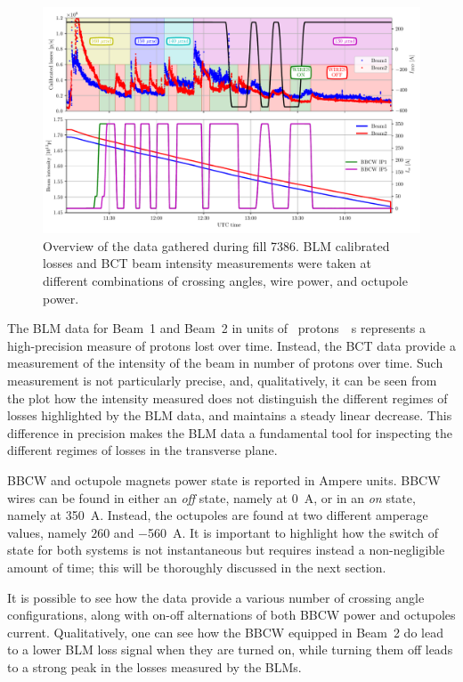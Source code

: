 \begin{figure}[hpt]
    \centering
    \includegraphics[width=1.0\textwidth]{5_wire_compensators_LHC/figs/wire_summary.pdf}
    \caption{Overview of the data gathered during fill 7386. BLM calibrated losses and BCT beam intensity measurements were taken at different combinations of crossing angles, wire power, and octupole power.}
    \label{fig:wire-data}
\end{figure}

The BLM data for Beam~1 and Beam~2 in units of \SI{}{protons \per s} represents a high-precision measure of protons lost over time. Instead, the BCT data provide a measurement of the intensity of the beam in number of protons over time. Such measurement is not particularly precise, and, qualitatively, it can be seen from the plot how the intensity measured does not distinguish the different regimes of losses highlighted by the BLM data, and maintains a steady linear decrease. This difference in precision makes the BLM data a fundamental tool for inspecting the different regimes of losses in the transverse plane.  

BBCW and octupole magnets power state is reported in Ampere units.  BBCW wires can be found in either an \textit{off} state, namely at \SI{0}{\ampere}, or in an \textit{on} state, namely at \SI{350}{\ampere}. Instead, the octupoles are found at two different amperage values, namely $260$ and \SI{-560}{\ampere}. It is important to highlight how the switch of state for both systems is not instantaneous but requires instead a non-negligible amount of time; this will be thoroughly discussed in the next section.

It is possible to see how the data provide a various number of crossing angle configurations, along with on-off alternations of both BBCW power and octupoles current. Qualitatively, one can see how the BBCW equipped in Beam~2 do lead to a lower BLM loss signal when they are turned on, while turning them off leads to a strong peak in the losses measured by the BLMs.

